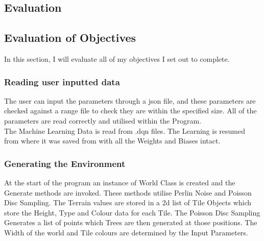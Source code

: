 \begin{flushleft}
    \huge
    \section{Evaluation}
    \vspace{0.1cm}

    \large
    \subsection{Evaluation of Objectives}
        \vspace{0.2cm}
        In this section, I will evaluate all of my objectives I set out to complete.
        \vspace{0.2cm}

        \subsubsection{Reading user inputted data}
            \vspace{0.2cm}
            The user can input the parameters through a json file, and these parameters are checked against a range file to check they are within
            the specified size. All of the parameters are read correctly and utilised within the Program. \\
            \vspace{0.2cm}
            The Machine Learning Data is read from .dqn files. The Learning is resumed from where it was saved from with all the Weights and
            Biases intact. \\

            \vspace{0.5cm}    
        \subsubsection{Generating the Environment}
            \vspace{0.2cm}
            At the start of the program an instance of World Class is created and the Generate methods are invoked. These methods utilise Perlin
            Noise and Poisson Disc Sampling. The Terrain values are stored in a 2d list of Tile Objects which store the Height, Type and Colour data
            for each Tile. The Poisson Disc Sampling Generates a list of points which Trees are then generated at those positions. The Width
            of the world and Tile colours are determined by the Input Parameters. \\


\end{flushleft}
